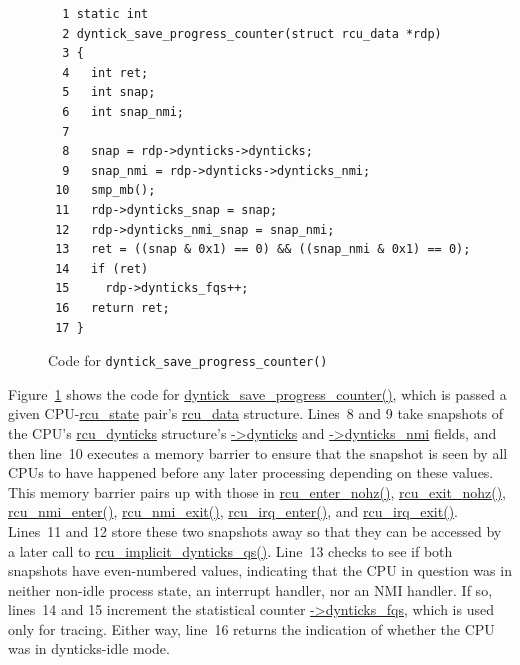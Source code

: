 \begin{figure}[tbp]
{ \scriptsize
\begin{verbatim}
  1 static int
  2 dyntick_save_progress_counter(struct rcu_data *rdp)
  3 {
  4   int ret;
  5   int snap;
  6   int snap_nmi;
  7
  8   snap = rdp->dynticks->dynticks;
  9   snap_nmi = rdp->dynticks->dynticks_nmi;
 10   smp_mb();
 11   rdp->dynticks_snap = snap;
 12   rdp->dynticks_nmi_snap = snap_nmi;
 13   ret = ((snap & 0x1) == 0) && ((snap_nmi & 0x1) == 0);
 14   if (ret)
 15     rdp->dynticks_fqs++;
 16   return ret;
 17 }
\end{verbatim}
}
\caption{Code for {\tt dyntick\_save\_progress\_counter()}}
\label{fig:app:rcuimpl:rcutreewt:Code for dyntick-save-progress-counter}
\end{figure}

Figure~\ref{fig:app:rcuimpl:rcutreewt:Code for dyntick-save-progress-counter}
shows the code for \url{dyntick_save_progress_counter()}, which
is passed a given CPU-\url{rcu_state} pair's \url{rcu_data} structure.
Lines~8 and 9 take snapshots of the CPU's \url{rcu_dynticks} structure's
\url{->dynticks} and \url{->dynticks_nmi} fields,
and then line~10 executes a memory barrier to ensure that the snapshot
is seen by all CPUs to have happened before any later processing
depending on these values.
This memory barrier pairs up with those in \url{rcu_enter_nohz()},
\url{rcu_exit_nohz()}, \url{rcu_nmi_enter()}, \url{rcu_nmi_exit()},
\url{rcu_irq_enter()}, and \url{rcu_irq_exit()}.
Lines~11 and 12 store these two snapshots away so that they can be
accessed by a later call to \url{rcu_implicit_dynticks_qs()}.
Line~13 checks to see if both snapshots have even-numbered values,
indicating that the CPU in question was in neither non-idle process
state, an interrupt handler, nor an NMI handler.
If so, lines~14 and 15 increment the statistical counter
\url{->dynticks_fqs}, which is used only for tracing.
Either way, line~16 returns the indication of whether the CPU was
in dynticks-idle mode.

